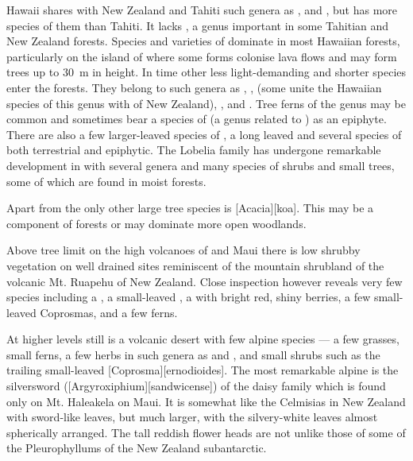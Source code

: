 Hawai{\okina}i shares with New Zealand and Tahiti such genera as ,  and , but has more species of them than Tahiti.
It lacks , a genus important in some Tahitian and New Zealand forests.
Species and varieties of  dominate in most Hawaiian forests, particularly on the island of  where some forms colonise lava flows and may form trees up to \SI{30}{\metre} in height.
In time other less light-demanding and shorter species enter the forests.
They belong to such genera as , ,  (some unite the Hawaiian species of this genus with  of New Zealand), ,  and .
Tree ferns of the genus  may be common and sometimes bear a species of  (a genus related to ) as an epiphyte.
There are also a few larger-leaved species of , a long leaved  and several species of  both terrestrial and epiphytic.
The Lobelia family has undergone remarkable development in  with several genera and many species of shrubs and small trees, some of which are found in moist forests.

Apart from  the only other large tree species is [Acacia][koa].
This may be a component of  forests or may dominate more open woodlands.

Above tree limit on the high volcanoes of  and Maui there is low shrubby vegetation on well drained sites reminiscent of the mountain shrubland of the volcanic Mt.
Ruapehu of New Zealand.
Close inspection however reveals very few species including a , a small-leaved , a  with bright red, shiny berries, a few small-leaved Coprosmas, and a few ferns.

At higher levels still is a volcanic desert with few alpine species --- a few grasses, small ferns, a few herbs in such genera as  and , and small shrubs such as the trailing small-leaved [Coprosma][ernodioides].
The most remarkable alpine is the silversword ([Argyroxiphium][sandwicense]) of the daisy family which is found only on Mt.
Haleakela on Maui.
It is somewhat like the Celmisias in New Zealand with sword-like leaves, but much larger, with the silvery-white leaves almost spherically arranged.
The tall reddish flower heads are not unlike those of some of the Pleurophyllums of the New Zealand subantarctic.

